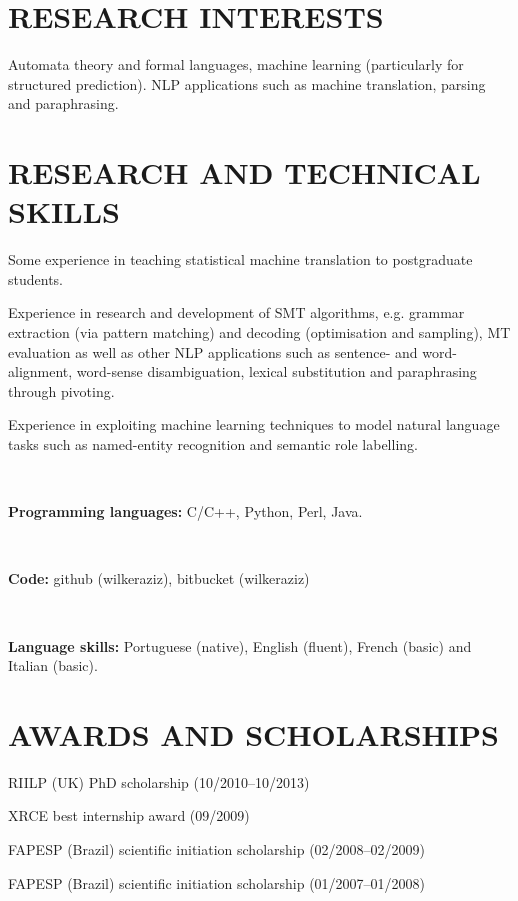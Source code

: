 \section*{RESEARCH INTERESTS}

Automata theory and formal languages, machine learning (particularly for structured prediction). NLP applications such as machine translation, parsing and paraphrasing.

\section*{RESEARCH AND TECHNICAL SKILLS}

Some experience in teaching statistical machine translation to postgraduate students.

Experience in research and development of SMT algorithms, e.g. grammar extraction (via pattern matching) and decoding (optimisation and sampling), MT evaluation as well as other NLP applications such as sentence- and word-alignment, word-sense disambiguation, lexical substitution and paraphrasing through pivoting. 

Experience in exploiting machine learning techniques to model natural language tasks such as named-entity recognition and semantic role labelling.

~

{\bf Programming languages:} C/C++, Python, Perl, Java.

~

{\bf Code:} github (wilkeraziz), bitbucket (wilkeraziz)

~

{\bf Language skills:} Portuguese (native), English (fluent), French (basic) and Italian (basic).

\section*{AWARDS AND SCHOLARSHIPS}
\begin{description}
	\item RIILP (UK) PhD scholarship (10/2010--10/2013)
	\item XRCE best internship award (09/2009)
	\item FAPESP (Brazil) scientific initiation scholarship (02/2008--02/2009)
	\item FAPESP (Brazil) scientific initiation scholarship (01/2007--01/2008)
\end{description}
